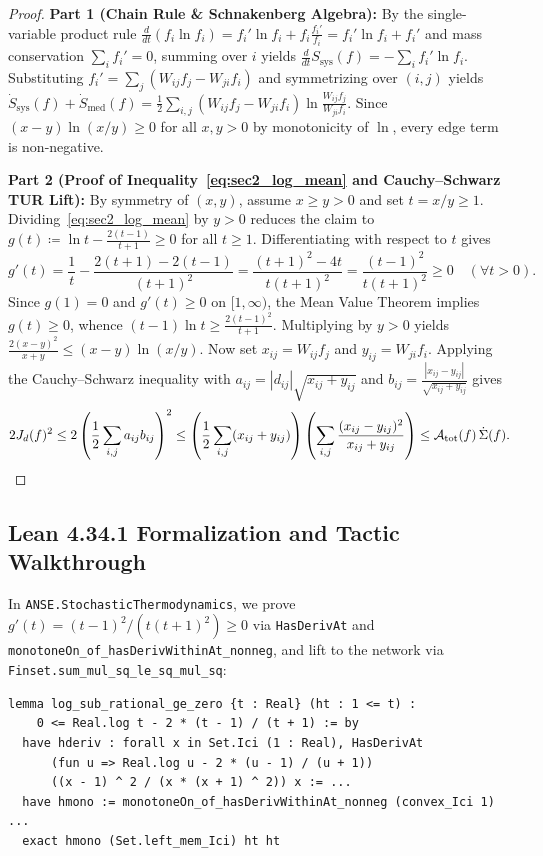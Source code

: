 \documentclass[11pt,a4paper]{article}
\theoremstyle{definition}
\theoremstyle{remark}
\begin{document}
\begin{proof}
\textbf{Part 1 (Chain Rule \& Schnakenberg Algebra):} By the single-variable product rule $\frac{d}{dt}(f_i \ln f_i) = f_i' \ln f_i + f_i \frac{f_i'}{f_i} = f_i' \ln f_i + f_i'$ and mass conservation $\sum_i f_i' = 0$, summing over $i$ yields $\frac{d}{dt}S_{\mathrm{sys}}(f) = -\sum_i f_i'\ln f_i$. Substituting $f_i' = \sum_j (W_{ij}f_j - W_{ji}f_i)$ and symmetrizing over $(i,j)$ yields $\dot{S}_{\mathrm{sys}}(f) + \dot{S}_{\mathrm{med}}(f) = \frac{1}{2}\sum_{i,j}(W_{ij}f_j - W_{ji}f_i)\ln\frac{W_{ij}f_j}{W_{ji}f_i}$. Since $(x - y)\ln(x/y) \ge 0$ for all $x, y > 0$ by monotonicity of $\ln$, every edge term is non-negative.

\textbf{Part 2 (Proof of Inequality~\eqref{eq:sec2_log_mean} and Cauchy--Schwarz TUR Lift):} By symmetry of $(x,y)$, assume $x \ge y > 0$ and set $t = x/y \ge 1$. Dividing~\eqref{eq:sec2_log_mean} by $y > 0$ reduces the claim to $g(t) \coloneqq \ln t - \frac{2(t-1)}{t+1} \ge 0$ for all $t \ge 1$. Differentiating with respect to $t$ gives
\[
  g'(t) = \frac{1}{t} - \frac{2(t+1) - 2(t-1)}{(t+1)^2} = \frac{(t+1)^2 - 4t}{t(t+1)^2} = \frac{(t - 1)^2}{t(t+1)^2} \ge 0 \quad (\forall t > 0).
\]
Since $g(1) = 0$ and $g'(t) \ge 0$ on $[1, \infty)$, the Mean Value Theorem implies $g(t) \ge 0$, whence $(t-1)\ln t \ge \frac{2(t-1)^2}{t+1}$. Multiplying by $y > 0$ yields $\frac{2(x-y)^2}{x+y} \le (x-y)\ln(x/y)$. Now set $x_{ij} = W_{ij}f_j$ and $y_{ij} = W_{ji}f_i$. Applying the Cauchy--Schwarz inequality with $a_{ij} = |d_{ij}|\sqrt{x_{ij}+y_{ij}}$ and $b_{ij} = \frac{|x_{ij}-y_{ij}|}{\sqrt{x_{ij}+y_{ij}}}$ gives
\[
  2 J_d(f)^2 \le 2\left(\frac{1}{2}\sum_{i,j} a_{ij} b_{ij}\right)^2 \le \left(\frac{1}{2}\sum_{i,j} (x_{ij}+y_{ij})\right)\left(\sum_{i,j} \frac{(x_{ij}-y_{ij})^2}{x_{ij}+y_{ij}}\right) \le \mathcal{A}_{\mathrm{tot}}(f)\,\dot{\Sigma}(f). \qedhere
\]
\end{proof}

\subsection{Lean 4.34.1 Formalization and Tactic Walkthrough}
In \texttt{ANSE.StochasticThermodynamics}, we prove $g'(t) = (t-1)^2/(t(t+1)^2) \ge 0$ via \texttt{HasDerivAt} and \texttt{monotoneOn\_of\_hasDerivWithinAt\_nonneg}, and lift to the network via \texttt{Finset.sum\_mul\_sq\_le\_sq\_mul\_sq}:

\begin{lstlisting}
lemma log_sub_rational_ge_zero {t : Real} (ht : 1 <= t) :
    0 <= Real.log t - 2 * (t - 1) / (t + 1) := by
  have hderiv : forall x in Set.Ici (1 : Real), HasDerivAt
      (fun u => Real.log u - 2 * (u - 1) / (u + 1))
      ((x - 1) ^ 2 / (x * (x + 1) ^ 2)) x := ...
  have hmono := monotoneOn_of_hasDerivWithinAt_nonneg (convex_Ici 1) ...
  exact hmono (Set.left_mem_Ici) ht ht
\end{lstlisting}
\end{document}

